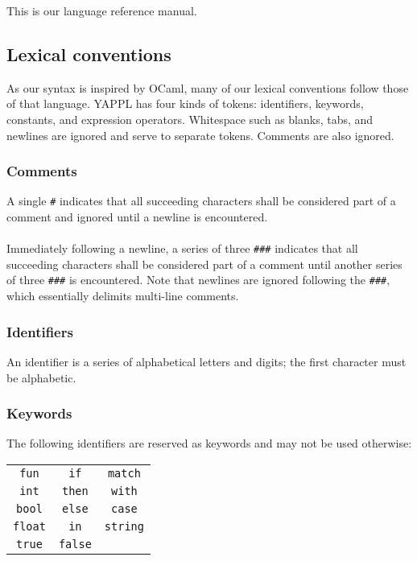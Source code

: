 This is our language reference manual. 

\subsection{Lexical conventions}

As our syntax is inspired by OCaml, many of our lexical conventions follow those of that language. YAPPL has four kinds of tokens: identifiers, keywords, constants, and expression operators. Whitespace such as blanks, tabs, and newlines are ignored and serve to separate tokens. Comments are also ignored.

\subsubsection{Comments}

A single \texttt{\#} indicates that all succeeding characters shall be considered part of a comment and ignored until a newline is encountered. \\
\\
Immediately following a newline, a series of three \texttt{\#\#\#} indicates that all succeeding characters shall be considered part of a comment until another series of three \texttt{\#\#\#} is encountered. Note that newlines are ignored following the \texttt{\#\#\#}, which essentially delimits multi-line comments.

\subsubsection{Identifiers}

An identifier is a series of alphabetical letters and digits; the first character must be alphabetic. 

\subsubsection{Keywords}

The following identifiers are reserved as keywords and may not be used otherwise:
\begin{table}[htdp]
\center
\begin{tabular}{c c c}
\texttt{fun} & \texttt{if} &\texttt{match} \\
\texttt{int} & \texttt{then} & \texttt{with} \\
\texttt{bool} & \texttt{else} &\texttt{case} \\
\texttt{float} & \texttt{in} & \texttt{string} \\
\texttt{true} & \texttt{false} \\
\end{tabular}
\label{default}
\end{table}%



